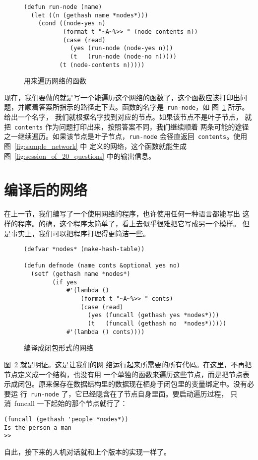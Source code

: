 \begin{figure}
\begin{lstlisting}
(defun run-node (name)
  (let ((n (gethash name *nodes*)))
    (cond ((node-yes n)
           (format t "~A~%>> " (node-contents n))
           (case (read)
             (yes (run-node (node-yes n)))
             (t   (run-node (node-no n)))))
          (t (node-contents n)))))
\end{lstlisting}
  \caption{\label{fig:function_for_traversing_networks}用来遍历网络的函数}
\end{figure}

现在，我们要做的就是写一个能遍历这个网络的函数了，这个函数应该打印出问
题，并顺着答案所指示的路径走下去。函数的名字是~\texttt{run-node}，如
图~\ref{fig:function_for_traversing_networks} 所示。给出一个名字，
我们就根据名字找到对应的节点。如果该节点不是叶子节点，
就把~\texttt{contents} 作为问题打印出来，按照答案不同，我们继续顺着
两条可能的途径之一继续遍历。如果该节点是叶子节点，\texttt{run-node} 
会径直返回~\texttt{contents}。使用图~\ref{fig:sample_network} 中
定义的网络，这个函数就能生成图~\ref{fig:session_of_20_questions} 
中的输出信息。


\section{编译后的网络}
\label{sec:compiling_networks}

在上一节，我们编写了一个使用网络的程序，也许使用任何一种语言都能写出
这样的程序。的确，这个程序太简单了，看上去似乎很难把它写成另一个模样。
但是事实上，我们可以把程序打理得更简洁一些。

\begin{figure}
\begin{lstlisting}
(defvar *nodes* (make-hash-table))

(defun defnode (name conts &optional yes no)
  (setf (gethash name *nodes*)
        (if yes
            #'(lambda ()
                (format t "~A~%>> " conts)
                (case (read)
                  (yes (funcall (gethash yes *nodes*)))
                  (t   (funcall (gethash no  *nodes*)))))
            #'(lambda () conts))))
\end{lstlisting}
  \caption{\label{fig:a_netwok_compiled_into_closures}编译成闭包形式的网络}
\end{figure}

图~\ref{fig:a_netwok_compiled_into_closures} 就是明证。这是让我们的网
络运行起来所需要的所有代码。在这里，不再把节点定义成一个结构，也没有用
一个单独的函数来遍历这些节点，而是把节点表示成闭包。原来保存在数据结构里的数据现在栖身于闭包里的变量绑定中。没有必要运
行~\texttt{run-node} 了，它已经隐含在了节点自身里面。要启动遍历过程，
只消~funcall 一下起始的那个节点就行了：
\begin{lstlisting}
(funcall (gethash 'people *nodes*))
Is the person a man
>>
\end{lstlisting}
自此，接下来的人机对话就和上个版本的实现一样了。

